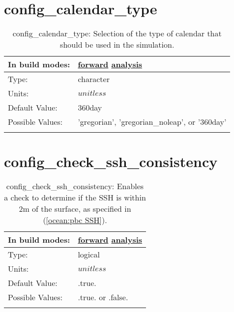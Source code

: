 \section[config\_calendar\_type]{config\_calendar\_type}
\label{sec:nm_sec_config_calendar_type}
\begin{center}
\begin{longtable}{| p{2.0in} || p{4.0in} |}
    \hline
    In build modes: & \hyperref[subsec:forward_nm_tab_time_management]{forward} \hyperref[subsec:analysis_nm_tab_time_management]{analysis} \\
    \hline
    Type: & character \\
    \hline
    Units: & $unitless$ \\
    \hline
    Default Value: & 360day \\
    \hline
    Possible Values: & 'gregorian', 'gregorian\_noleap', or '360day' \\
    \hline
    \caption{config\_calendar\_type: Selection of the type of calendar that should be used in the simulation.}
\end{longtable}
\end{center}
\section[config\_check\_ssh\_consistency]{config\_check\_ssh\_consistency}
\label{sec:nm_sec_config_check_ssh_consistency}
\begin{center}
\begin{longtable}{| p{2.0in} || p{4.0in} |}
    \hline
    In build modes: & \hyperref[subsec:forward_nm_tab_partial_bottom_cells]{forward} \hyperref[subsec:analysis_nm_tab_partial_bottom_cells]{analysis} \\
    \hline
    Type: & logical \\
    \hline
    Units: & $unitless$ \\
    \hline
    Default Value: & .true. \\
    \hline
    Possible Values: & .true. or .false. \\
    \hline
    \caption{config\_check\_ssh\_consistency: Enables a check to determine if the SSH is within 2m of the surface, as specified in (\ref{ocean:pbc SSH}).}
\end{longtable}
\end{center}
